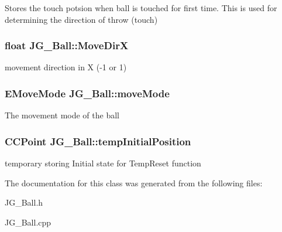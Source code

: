 Stores the touch potsion when ball is touched for first time. This is used for determining the direction of throw (touch) \hypertarget{class_j_g___ball_a790ad2df70ea24be8b2b01482c16c4f9}{
\subsubsection[{Move\-Dir\-X}]{\setlength{\rightskip}{0pt plus 5cm}float J\-G\-\_\-\-Ball\-::\-Move\-Dir\-X}}\label{class_j_g___ball_a790ad2df70ea24be8b2b01482c16c4f9}
movement direction in X (-\/1 or 1) \hypertarget{class_j_g___ball_a0ad0f2f4b8d03d63c879544111a24506}{
\subsubsection[{move\-Mode}]{\setlength{\rightskip}{0pt plus 5cm}E\-Move\-Mode J\-G\-\_\-\-Ball\-::move\-Mode}}\label{class_j_g___ball_a0ad0f2f4b8d03d63c879544111a24506}
The movement mode of the ball \hypertarget{class_j_g___ball_a2cab0645b2eb4374fbfde0b0399c0e72}{
\subsubsection[{temp\-Initial\-Position}]{\setlength{\rightskip}{0pt plus 5cm}C\-C\-Point J\-G\-\_\-\-Ball\-::temp\-Initial\-Position}}\label{class_j_g___ball_a2cab0645b2eb4374fbfde0b0399c0e72}
temporary storing Initial state for Temp\-Reset function 

The documentation for this class was generated from the following files\-:\begin{DoxyCompactItemize}
\item 
J\-G\-\_\-\-Ball.\-h\item 
J\-G\-\_\-\-Ball.\-cpp\end{DoxyCompactItemize}
